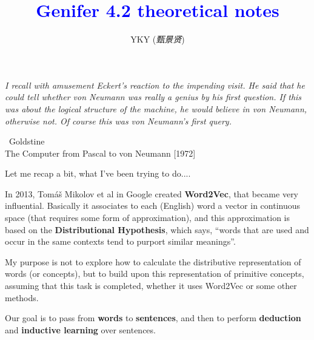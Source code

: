 \documentclass[12pt]{article}
\title{\textcolor{blue}{Genifer 4.2 theoretical notes}}
\author{YKY (\textit{甄景贤})}
\newcommand{\tab}{\hspace*{1cm}}
\begin{document}
\tab\tab\tab \parbox{10cm}{\textit{I recall with amusement Eckert's reaction to the impending visit. He said that he could tell whether von Neumann was really a genius by his first question. If this was about the logical structure of the machine, he would believe in von Neumann, otherwise not. Of course this was von Neumann's first query.}}
\begin{flushright}
\textemdash\, Goldstine \\The Computer from Pascal to von Neumann [1972]
\end{flushright}

\sffamily

{\let\newpage\relax\maketitle}

\maketitle
\setlength{\parindent}{0em}
\setlength{\parskip}{1.5ex plus0.5ex minus1.2ex}

Let me recap a bit, what I've been trying to do....


In 2013, Tom\'{a}\v{s} Mikolov et al in Google created \textbf{Word2Vec}, that became very influential.  Basically it associates to each (English) word a vector in continuous space (that requires some form of approximation), and this approximation is based on the \textbf{Distributional Hypothesis}, which says, ``words that are used and occur in the same contexts tend to purport similar meanings''.

My purpose is not to explore how to calculate the distributive representation of words (or concepts), but to build upon this representation of primitive concepts, assuming that this task is completed, whether it uses Word2Vec or some other methods.


Our goal is to pass from \textbf{words} to \textbf{sentences}, and then to perform \textbf{deduction} and \textbf{inductive learning} over sentences.
\end{document}
